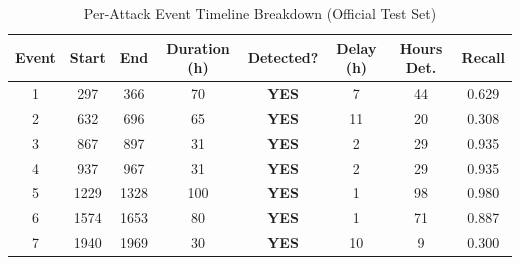 \begin{table}[htbp]
\centering
\caption{Per-Attack Event Timeline Breakdown (Official Test Set)}
\label{tab:per_event_timeline}
\begin{tabular}{cccccccc}
\toprule
Event & Start & End & Duration (h) & Detected? & Delay (h) & Hours Det. & Recall \\
\midrule
1 & 297 & 366 & 70 & \textbf{YES} & 7 & 44 & 0.629 \\
2 & 632 & 696 & 65 & \textbf{YES} & 11 & 20 & 0.308 \\
3 & 867 & 897 & 31 & \textbf{YES} & 2 & 29 & 0.935 \\
4 & 937 & 967 & 31 & \textbf{YES} & 2 & 29 & 0.935 \\
5 & 1229 & 1328 & 100 & \textbf{YES} & 1 & 98 & 0.980 \\
6 & 1574 & 1653 & 80 & \textbf{YES} & 1 & 71 & 0.887 \\
7 & 1940 & 1969 & 30 & \textbf{YES} & 10 & 9 & 0.300 \\
\bottomrule
\end{tabular}
\end{table}

